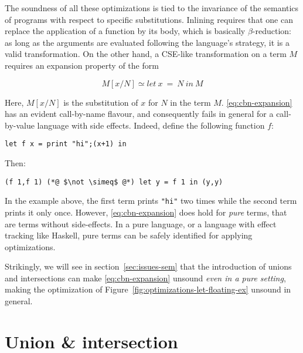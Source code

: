 \documentclass[sigplan,10pt,review,anonymous]{acmart}
\newcommand{\info}[2][1=]{}
\newcommand{\nickel}[1]{\lstinline[language=nickel]{#1}}
\begin{document}
The soundness of all these optimizations is tied to the invariance of the
semantics of programs with respect to specific substitutions. Inlining requires
that one can replace the application of a function by its body, which is
basically $\beta$-reduction: as long as the arguments are evaluated following
the language's strategy, it is a valid transformation. On the other hand,
a CSE-like transformation on a term $M$ requires an expansion property of the form

\begin{equation}\label{eq:cbn-expansion}
M[x/N] \simeq let~x~=~N~in~M
\end{equation}

Here, $M[x/N]$ is the substitution of $x$ for $N$ in the term $M$.
\ref{eq:cbn-expansion} has an evident call-by-name flavour, and consequently
fails in general for a call-by-value language with side effects.  Indeed, define
the following function $f$:

\begin{lstlisting}[language=Nickel]
let f x = print "hi";(x+1) in
\end{lstlisting}

Then:

\begin{lstlisting}[language=Nickel]
(f 1,f 1) (*@ $\not \simeq$ @*) let y = f 1 in (y,y)
\end{lstlisting}

In the example above, the first term prints \nickel{"hi"} two times while the
second term prints it only once. However, \ref{eq:cbn-expansion} does hold for
\emph{pure} terms, that are terms without side-effects. In a pure language, or a
language with effect tracking like Haskell, pure terms can be safely identified for applying
optimizations.

Strikingly, we will see in section~\ref{sec:issues-sem} that the introduction of
unions and intersections can make \ref{eq:cbn-expansion} unsound
\emph{even in a pure setting}, making the optimization of
Figure~\ref{fig:optimizations-let-floating-ex} unsound in general.


\section{Union \& intersection}
\label{sec:union-inter}
\info{What are they, what are they used for.}

\end{document}
